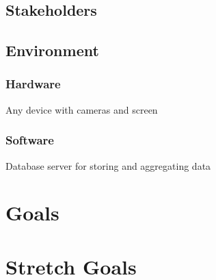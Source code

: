 \documentclass{article}
\begin{document}

\subsection{Stakeholders}

\subsection{Environment}

\subsubsection{Hardware} 
Any device with cameras and screen
\subsubsection{Software}
Database server for storing and aggregating data

\section{Goals}

\section{Stretch Goals}
\end{document}
